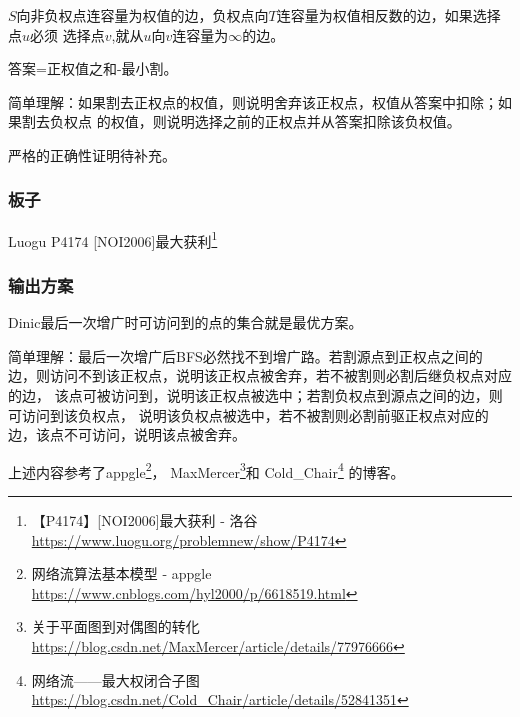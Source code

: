 $S$向非负权点连容量为权值的边，负权点向$T$连容量为权值相反数的边，如果选择点$u$必须
选择点$v$,就从$u$向$v$连容量为$\infty$的边。

答案=正权值之和-最小割。

简单理解：如果割去正权点的权值，则说明舍弃该正权点，权值从答案中扣除；如果割去负权点
的权值，则说明选择之前的正权点并从答案扣除该负权值。

严格的正确性证明待补充。

\subsubsection{板子}

Luogu P4174 [NOI2006]最大获利\footnote{【P4174】[NOI2006]最大获利 - 洛谷
\url{https://www.luogu.org/problemnew/show/P4174}}



\subsubsection{输出方案}

\begin{theorem}
    Dinic最后一次增广时可访问到的点的集合就是最优方案。
\end{theorem}

简单理解：最后一次增广后BFS必然找不到增广路。若割源点到正权点之间的
边，则访问不到该正权点，说明该正权点被舍弃，若不被割则必割后继负权点对应的边，
该点可被访问到，说明该正权点被选中；若割负权点到源点之间的边，则可访问到该负权点，
说明该负权点被选中，若不被割则必割前驱正权点对应的边，该点不可访问，说明该点被舍弃。

上述内容参考了appgle\footnote{网络流算法基本模型 - appgle
	\url{https://www.cnblogs.com/hyl2000/p/6618519.html}}，
MaxMercer\footnote{关于平面图到对偶图的转化 \\
	\url{https://blog.csdn.net/MaxMercer/article/details/77976666}}和
Cold\_Chair\footnote{网络流——最大权闭合子图 \\
	\url{https://blog.csdn.net/Cold\_Chair/article/details/52841351}}
的博客。
